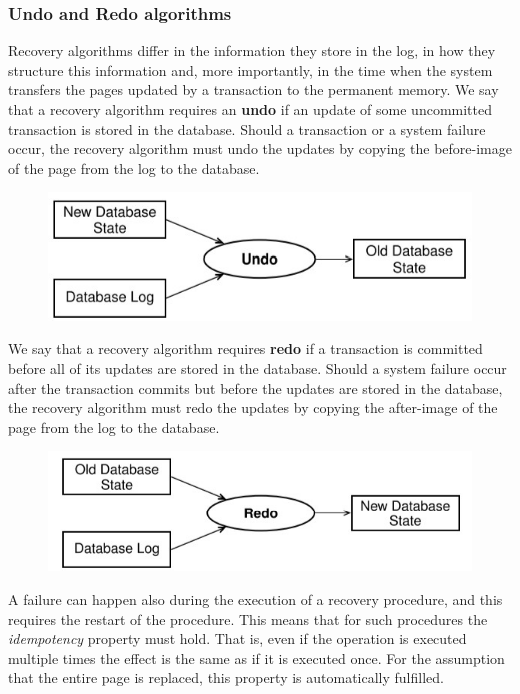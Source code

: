 \subsubsection{Undo and Redo algorithms}
Recovery algorithms differ in the information they store in the log, in how they structure this information and, more importantly, in the time when the system transfers the pages updated by a transaction to the permanent memory. We say that a recovery algorithm requires an \textbf{undo} if an update of some uncommitted transaction is stored in the database. Should a transaction or a system failure occur, the recovery algorithm must undo the updates by copying the before-image of the page from the log to the database. 

\begin{figure}[h!]
		\centering
		\includegraphics[scale = 1.3]{img/tr3.jpg}
		\label{tr2}
\end{figure}


We say that a recovery algorithm requires \textbf{redo} if a transaction is committed before all of its updates are stored in the database. Should a system failure occur after the transaction commits but before the updates are stored in the database, the recovery algorithm must redo the updates by copying the after-image of the page from the log to the database. 

\begin{figure}[H]
		\centering
		\includegraphics[scale = 1.3]{img/tr4.jpg}
		\label{tr2}
\end{figure}

A failure can happen also during the execution of a recovery procedure, and this requires the restart of the procedure. This means that for such procedures the \textit{idempotency} property must hold. That is, even if the operation is executed multiple times the effect is the same as if it is executed once. For the assumption that the entire page
is replaced, this property is automatically fulfilled.

